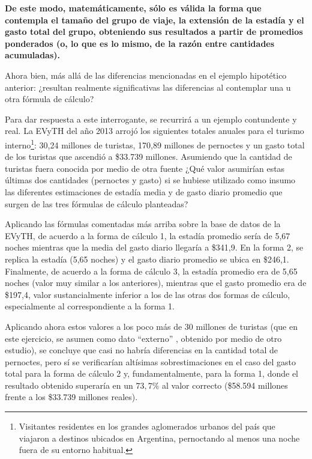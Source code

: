 \documentclass[
]{book}
\begin{document}
\textbf{De este modo, matemáticamente, sólo es válida la forma que contempla el tamaño del grupo de viaje, la extensión de la estadía y el gasto total del grupo, obteniendo sus resultados a partir de promedios ponderados (o, lo que es lo mismo, de la razón entre cantidades acumuladas).}

Ahora bien, más allá de las diferencias mencionadas en el ejemplo hipotético anterior: ¿resultan realmente significativas las diferencias al contemplar una u otra fórmula de cálculo?

Para dar respuesta a este interrogante, se recurrirá a un ejemplo contundente y real. La EVyTH del año 2013 arrojó los siguientes totales anuales para el turismo interno\footnote{Visitantes residentes en los grandes aglomerados urbanos del país que viajaron a destinos ubicados en Argentina, pernoctando al menos una noche fuera de su entorno habitual.}: 30,24 millones de turistas, 170,89 millones de pernoctes y un gasto total de los turistas que ascendió a \$33.739 millones. Asumiendo que la cantidad de turistas fuera conocida por medio de otra fuente ¿Qué valor asumirían estas últimas dos cantidades (pernoctes y gasto) si se hubiese utilizado como insumo las diferentes estimaciones de estadía media y de gasto diario promedio que surgen de las tres fórmulas de cálculo planteadas?

Aplicando las fórmulas comentadas más arriba sobre la base de datos de la EVyTH, de acuerdo a la forma de cálculo 1, la estadía promedio sería de 5,67 noches mientras que la media del gasto diario llegaría a \$341,9. En la forma 2, se replica la estadía (5,65 noches) y el gasto diario promedio se ubica en \$246,1. Finalmente, de acuerdo a la forma de cálculo 3, la estadía promedio era de 5,65 noches (valor muy similar a los anteriores), mientras que el gasto promedio era de \$197,4, valor sustancialmente inferior a los de las otras dos formas de cálculo, especialmente al correspondiente a la forma 1.

Aplicando ahora estos valores a los poco más de 30 millones de turistas (que en este ejercicio, se asumen como dato ``externo'' , obtenido por medio de otro estudio), se concluye que casi no habría diferencias en la cantidad total de pernoctes, pero sí se verificarían altísimas sobrestimaciones en el caso del gasto total para la forma de cálculo 2 y, fundamentalmente, para la forma 1, donde el resultado obtenido superaría en un \(73,7\%\) al valor correcto (\$58.594 millones frente a los \$33.739 millones reales).
\end{document}
